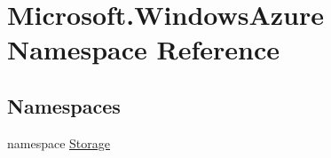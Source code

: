 \hypertarget{namespaceMicrosoft_1_1WindowsAzure}{}\section{Microsoft.\+Windows\+Azure Namespace Reference}
\label{namespaceMicrosoft_1_1WindowsAzure}
\subsection*{Namespaces}
\begin{DoxyCompactItemize}
\item 
namespace \hyperlink{namespaceMicrosoft_1_1WindowsAzure_1_1Storage}{Storage}
\end{DoxyCompactItemize}
